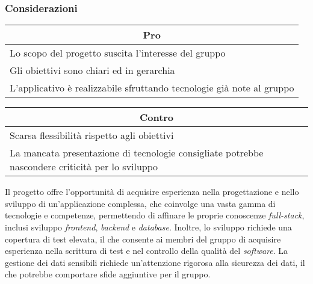 \subsubsection{Considerazioni}
\begin{minipage}[t]{0.45\linewidth}
    \vspace{0pt}
    {\renewcommand{\arraystretch}{1.5}
    \begin{tabular}{p{1\linewidth}}
        \multicolumn{1}{c}{\textbf{Pro}} \\
        \midrule
        Lo scopo del progetto suscita l'interesse del gruppo \\
        Gli obiettivi sono chiari ed in gerarchia \\
        L'applicativo è realizzabile sfruttando tecnologie già note al gruppo \\
        \hline
    \end{tabular}
    }
\end{minipage}
\hspace{0.05\linewidth}
\begin{minipage}[t]{0.45\linewidth}
    \vspace{0pt}
    {\renewcommand{\arraystretch}{1.5}
    \begin{tabular}{p{1\linewidth}}
        \multicolumn{1}{c}{\textbf{Contro}} \\
        \midrule
        Scarsa flessibilità rispetto agli obiettivi \\
        La mancata presentazione di tecnologie consigliate potrebbe nascondere criticità per lo sviluppo\\
        \hline
    \end{tabular}
    }
\end{minipage}
\vspace{1em}

\noindent
Il progetto offre l'opportunità di acquisire esperienza nella progettazione e nello sviluppo di un'applicazione complessa, che coinvolge una vasta gamma di tecnologie e competenze, permettendo di affinare le proprie conoscenze \textit{full-stack}, inclusi sviluppo \textit{frontend}, \textit{backend} e \textit{database}.
Inoltre, lo sviluppo richiede una copertura di test elevata, il che consente ai membri del gruppo di acquisire esperienza nella scrittura di test e nel controllo della qualità del \textit{software}.
La gestione dei dati sensibili richiede un'attenzione rigorosa alla sicurezza dei dati, il che potrebbe comportare sfide aggiuntive per il gruppo.
